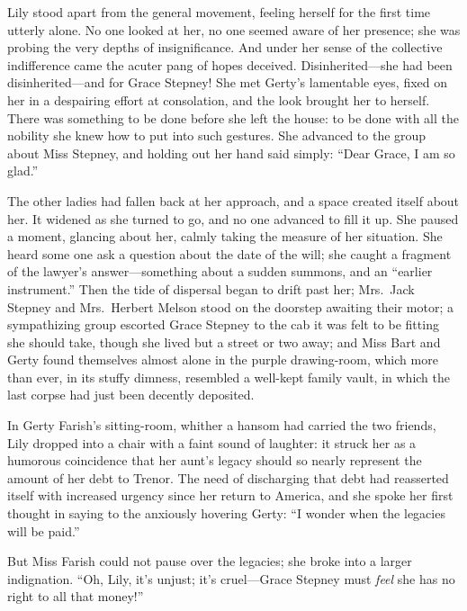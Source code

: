 \documentclass[12pt,a4paper]{book}
\begin{document}
Lily stood apart from the general movement, feeling herself for
the first time utterly alone. No one looked at her, no one seemed
aware of her presence; she was probing the very depths of
insignificance. And under her sense of the collective
indifference came the acuter pang of hopes deceived. 
Disinherited---she had been disinherited---and for Grace Stepney! 
She met Gerty's lamentable eyes, fixed on her in a despairing
effort at consolation, and the look brought her to herself. There
was something to be done before she left the house: to be done
with all the nobility she knew how to put into such gestures. She
advanced to the group about Miss Stepney, and holding out her
hand said simply: ``Dear Grace, I am so glad.''





The other ladies had fallen back at her approach, and a space
created itself about her. It widened as she turned to go, and no
one advanced to fill it up. She paused a moment, glancing about
her, calmly taking the measure of her situation. She heard some
one ask a question about the date of the will; she caught a
fragment of the lawyer's answer---something about a sudden
summons, and an ``earlier instrument.'' Then the tide of dispersal
began to drift past her; Mrs.\ Jack Stepney and Mrs.\ Herbert Melson
stood on the doorstep awaiting their motor; a sympathizing group
escorted Grace Stepney to the cab it was felt to be fitting she
should take, though she lived but a street or two away; and
Miss Bart and Gerty found themselves almost alone in the purple
drawing-room, which more than ever, in its stuffy dimness,
resembled a well-kept family vault, in which the last corpse had
just been decently deposited.







In Gerty Farish's sitting-room, whither a hansom had carried the
two friends, Lily dropped into a chair with a faint sound of
laughter: it struck her as a humorous coincidence that her aunt's
legacy should so nearly represent the amount of her debt to
Trenor. The need of discharging that debt had reasserted itself
with increased urgency since her return to America, and she spoke
her first thought in saying to the anxiously hovering Gerty: ``I
wonder when the legacies will be paid.''





But Miss Farish could not pause over the legacies; she broke into
a larger indignation. ``Oh, Lily, it's unjust; it's cruel---Grace
Stepney must \textit{feel} she has no right to all that money!''
\end{document}
